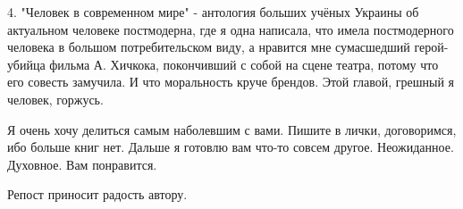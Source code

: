 4. "Человек в современном мире" - антология больших учёных Украины об
актуальном человеке постмодерна, где я одна написала, что имела постмодерного
человека в большом потребительском виду, а нравится мне сумасшедший
герой-убийца фильма А. Хичкока, покончивший с собой на сцене театра, потому что
его совесть замучила. И что моральность круче брендов. Этой главой, грешный я
человек, горжусь.

Я очень хочу делиться самым наболевшим с вами. Пишите в лички, договоримся, ибо
больше книг нет. Дальше я готовлю вам что-то совсем другое. Неожиданное.
Духовное. Вам понравится.

Репост приносит радость автору.
